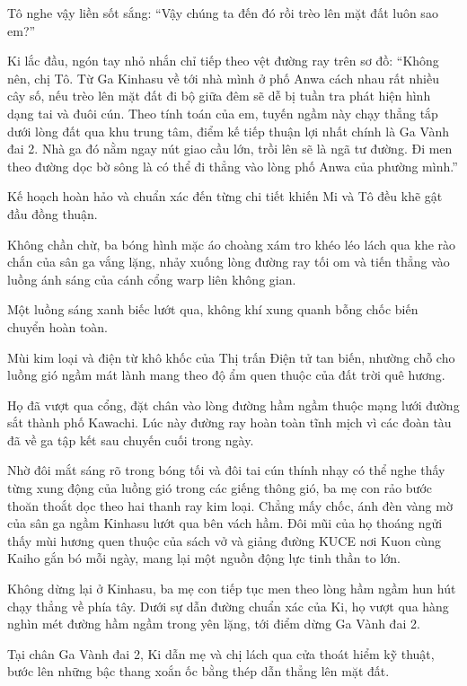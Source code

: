 \documentclass[../main.tex]{subfiles}
\begin{document}
Tô nghe vậy liền sốt sắng: ``Vậy chúng ta đến đó rồi trèo lên mặt đất luôn sao em?''

Ki lắc đầu, ngón tay nhỏ nhắn chỉ tiếp theo vệt đường ray trên sơ đồ: ``Không nên, chị Tô. Từ Ga Kinhasu về tới nhà mình ở phố Anwa cách nhau rất nhiều cây số, nếu trèo lên mặt đất đi bộ giữa đêm sẽ dễ bị tuần tra phát hiện hình dạng tai và đuôi cún. Theo tính toán của em, tuyến ngầm này chạy thẳng tắp dưới lòng đất qua khu trung tâm, điểm kế tiếp thuận lợi nhất chính là Ga Vành đai 2. Nhà ga đó nằm ngay nút giao cầu lớn, trồi lên sẽ là ngã tư đường. Đi men theo đường dọc bờ sông là có thể đi thẳng vào lòng phố Anwa của phường mình.''

Kế hoạch hoàn hảo và chuẩn xác đến từng chi tiết khiến Mi và Tô đều khẽ gật đầu đồng thuận.

Không chần chừ, ba bóng hình mặc áo choàng xám tro khéo léo lách qua khe rào chắn của sân ga vắng lặng, nhảy xuống lòng đường ray tối om và tiến thẳng vào luồng ánh sáng của cánh cổng warp liên không gian.

\ct

Một luồng sáng xanh biếc lướt qua, không khí xung quanh bỗng chốc biến chuyển hoàn toàn.

Mùi kim loại và điện từ khô khốc của Thị trấn Điện tử tan biến, nhường chỗ cho luồng gió ngầm mát lành mang theo độ ẩm quen thuộc của đất trời quê hương.

Họ đã vượt qua cổng, đặt chân vào lòng đường hầm ngầm thuộc mạng lưới đường sắt thành phố Kawachi. Lúc này đường ray hoàn toàn tĩnh mịch vì các đoàn tàu đã về ga tập kết sau chuyến cuối trong ngày.

Nhờ đôi mắt sáng rõ trong bóng tối và đôi tai cún thính nhạy có thể nghe thấy từng xung động của luồng gió trong các giếng thông gió, ba mẹ con rảo bước thoăn thoắt dọc theo hai thanh ray kim loại. Chẳng mấy chốc, ánh đèn vàng mờ của sân ga ngầm Kinhasu lướt qua bên vách hầm. Đôi mũi của họ thoáng ngửi thấy mùi hương quen thuộc của sách vở và giảng đường KUCE nơi Kuon cùng Kaiho gắn bó mỗi ngày, mang lại một nguồn động lực tinh thần to lớn.

Không dừng lại ở Kinhasu, ba mẹ con tiếp tục men theo lòng hầm ngầm hun hút chạy thẳng về phía tây. Dưới sự dẫn đường chuẩn xác của Ki, họ vượt qua hàng nghìn mét đường hầm ngầm trong yên lặng, tới điểm dừng Ga Vành đai 2.

Tại chân Ga Vành đai 2, Ki dẫn mẹ và chị lách qua cửa thoát hiểm kỹ thuật, bước lên những bậc thang xoắn ốc bằng thép dẫn thẳng lên mặt đất.
\end{document}
